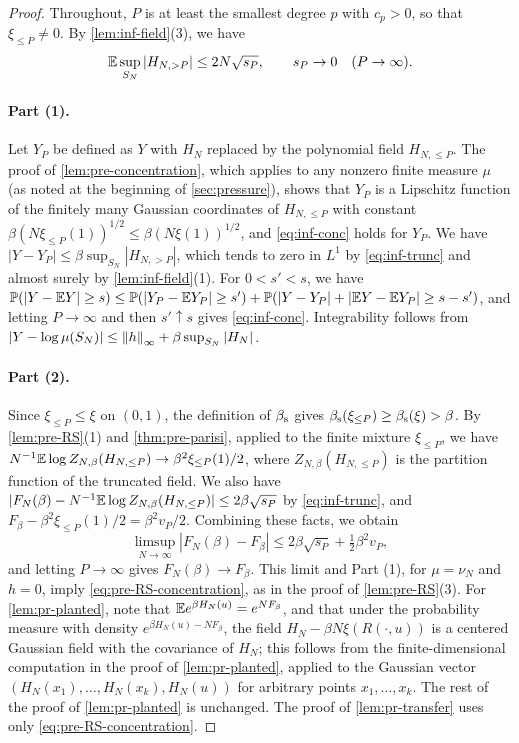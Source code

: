 \begin{proof}
Throughout, $P$ is at least the smallest degree $p$ with $c_p>0$, so that $\xi_{\le P}\neq0$. By \cref{lem:inf-field}(3), we have
\begin{equation}\label{eq:inf-trunc}
\mathbb E\sup_{S_N}|H_{N,>P}|\le2N\sqrt{s_P},\qquad s_P\to0\quad(P\to\infty).
\end{equation}

\paragraph{Part (1).} Let $Y_P$ be defined as $Y$ with $H_N$ replaced by the polynomial field $H_{N,\le P}$. The proof of \cref{lem:pre-concentration}, which applies to any nonzero finite measure $\mu$ (as noted at the beginning of \cref{sec:pressure}), shows that $Y_P$ is a Lipschitz function of the finitely many Gaussian coordinates of $H_{N,\le P}$ with constant $\beta(N\xi_{\le P}(1))^{1/2}\le\beta(N\xi(1))^{1/2}$, and \eqref{eq:inf-conc} holds for $Y_P$. We have $|Y-Y_P|\le\beta\sup_{S_N}|H_{N,>P}|$, which tends to zero in $L^1$ by \eqref{eq:inf-trunc} and almost surely by \cref{lem:inf-field}(1). For $0<s'<s$, we have $\mathbb P(|Y-\mathbb E Y|\ge s)\le\mathbb P(|Y_P-\mathbb E Y_P|\ge s')+\mathbb P(|Y-Y_P|+|\mathbb E Y-\mathbb E Y_P|\ge s-s')$, and letting $P\to\infty$ and then $s'\uparrow s$ gives \eqref{eq:inf-conc}. Integrability follows from $|Y-\log\mu(S_N)|\le\left\lVert h\right\rVert_\infty+\beta\sup_{S_N}|H_N|$.

\paragraph{Part (2).} Since $\xi_{\le P}\le\xi$ on $(0,1)$, the definition of $\beta_{\mathrm s}$ gives $\beta_{\mathrm s}(\xi_{\le P})\ge\beta_{\mathrm s}(\xi)>\beta$. By \cref{lem:pre-RS}(1) and \cref{thm:pre-parisi}, applied to the finite mixture $\xi_{\le P}$, we have $N^{-1}\mathbb E\log Z_{N,\beta}(H_{N,\le P})\to\beta^2\xi_{\le P}(1)/2$, where $Z_{N,\beta}(H_{N,\le P})$ is the partition function of the truncated field. We also have $|F_N(\beta)-N^{-1}\mathbb E\log Z_{N,\beta}(H_{N,\le P})|\le2\beta\sqrt{s_P}$ by \eqref{eq:inf-trunc}, and $F_\beta-\beta^2\xi_{\le P}(1)/2=\beta^2v_P/2$. Combining these facts, we obtain
\begin{equation*}
\limsup_{N\to\infty}|F_N(\beta)-F_\beta|\le2\beta\sqrt{s_P}+\tfrac12\beta^2v_P,
\end{equation*}
and letting $P\to\infty$ gives $F_N(\beta)\to F_\beta$. This limit and Part (1), for $\mu=\nu_N$ and $h=0$, imply \eqref{eq:pre-RS-concentration}, as in the proof of \cref{lem:pre-RS}(3). For \cref{lem:pr-planted}, note that $\mathbb E e^{\beta H_N(u)}=e^{NF_\beta}$, and that under the probability measure with density $e^{\beta H_N(u)-NF_\beta}$, the field $H_N-\beta N\xi(R(\cdot,u))$ is a centered Gaussian field with the covariance of $H_N$; this follows from the finite-dimensional computation in the proof of \cref{lem:pr-planted}, applied to the Gaussian vector $(H_N(x_1),\dots,H_N(x_k),H_N(u))$ for arbitrary points $x_1,\dots,x_k$. The rest of the proof of \cref{lem:pr-planted} is unchanged. The proof of \cref{lem:pr-transfer} uses only \eqref{eq:pre-RS-concentration}.


\end{proof}
